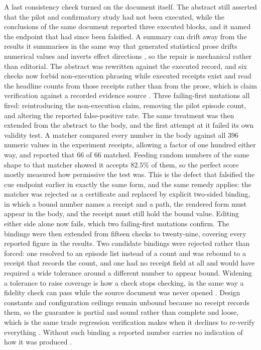 \documentclass[11pt,a4paper]{article}
\begin{document}
A last consistency check turned on the document itself. The abstract still asserted
that the pilot and confirmatory study had not been executed, while the conclusions of
the same document reported three executed blocks, and it named the endpoint that had
since been falsified. A summary can drift away from the results it summarises in the
same way that generated statistical prose drifts numerical values and inverts effect
directions \citep{claimlocked2026}, so the repair is mechanical rather than editorial.
The abstract was rewritten against the executed record, and six checks now forbid
non-execution phrasing while executed receipts exist and read the headline counts from
those receipts rather than from the prose, which is claim verification against a
recorded evidence source \citep{factcheckstages2026}. Three failing-first mutations all
fired: reintroducing the non-execution claim, removing the pilot episode count, and
altering the reported false-positive rate. The same treatment was then extended from the abstract to the body, and the first
attempt at it failed its own validity test. A matcher compared every number in the body
against all $396$ numeric values in the experiment receipts, allowing a factor of one
hundred either way, and reported that $66$ of $66$ matched. Feeding random numbers of the
same shape to that matcher showed it accepts $82.5\%$ of them, so the perfect score
mostly measured how permissive the test was. This is the defect that falsified the cue
endpoint earlier in exactly the same form, and the same remedy applies: the matcher was
rejected as a certificate and replaced by explicit two-sided binding, in which a bound
number names a receipt and a path, the rendered form must appear in the body, and the
receipt must still hold the bound value. Editing either side alone now fails, which two
failing-first mutations confirm. The bindings were then extended from fifteen checks to
twenty-nine, covering every reported figure in the results. Two candidate bindings were
rejected rather than forced: one resolved to an episode list instead of a count and was
rebound to a receipt that records the count, and one had no receipt field at all and would
have required a wide tolerance around a different number to appear bound. Widening a
tolerance to raise coverage is how a check stops checking, in the same way a fidelity
check can pass while the source document was never opened
\citep{fidelitywithoutevidence2026}. Design constants and configuration ceilings remain
unbound because no receipt records them, so the guarantee is partial and sound rather than
complete and loose, which is the same trade regression verification makes when it declines
to re-verify everything \citep{partialcontracts2026}. Without such binding a reported number carries no indication of how it was
produced \citep{boltonprovenance2026}.
\end{document}
